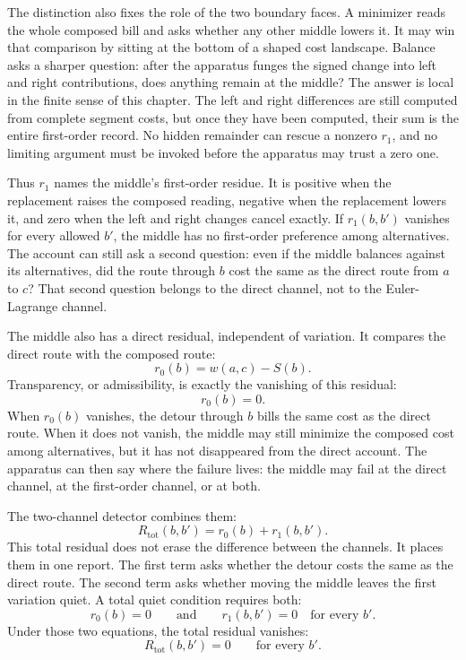 The distinction also fixes the role of the two boundary faces. A minimizer reads the whole composed bill and asks whether any other middle lowers it. It may win that comparison by sitting at the bottom of a shaped cost landscape. Balance asks a sharper question: after the apparatus funges the signed change into left and right contributions, does anything remain at the middle? The answer is local in the finite sense of this chapter. The left and right differences are still computed from complete segment costs, but once they have been computed, their sum is the entire first-order record. No hidden remainder can rescue a nonzero $r_1$, and no limiting argument must be invoked before the apparatus may trust a zero one.

Thus $r_1$ names the middle's first-order residue. It is positive when the replacement raises the composed reading, negative when the replacement lowers it, and zero when the left and right changes cancel exactly. If $r_1(b,b')$ vanishes for every allowed $b'$, the middle has no first-order preference among alternatives. The account can still ask a second question: even if the middle balances against its alternatives, did the route through $b$ cost the same as the direct route from $a$ to $c$? That second question belongs to the direct channel, not to the Euler-Lagrange channel.

The middle also has a direct residual, independent of variation. It compares the direct route with the composed route:
\[
  r_0(b) = w(a,c) - S(b).
\]
Transparency, or admissibility, is exactly the vanishing of this residual:
\[
  r_0(b) = 0.
\]
When $r_0(b)$ vanishes, the detour through $b$ bills the same cost as the direct route. When it does not vanish, the middle may still minimize the composed cost among alternatives, but it has not disappeared from the direct account. The apparatus can then say where the failure lives: the middle may fail at the direct channel, at the first-order channel, or at both.

The two-channel detector combines them:
\[
  R_{\mathrm{tot}}(b,b') = r_0(b) + r_1(b,b').
\]
This total residual does not erase the difference between the channels. It places them in one report. The first term asks whether the detour costs the same as the direct route. The second term asks whether moving the middle leaves the first variation quiet. A total quiet condition requires both:
\[
  r_0(b)=0
  \qquad\text{and}\qquad
  r_1(b,b')=0
  \quad \text{for every } b'.
\]
Under those two equations, the total residual vanishes:
\[
  R_{\mathrm{tot}}(b,b') = 0
  \qquad \text{for every } b'.
\]

